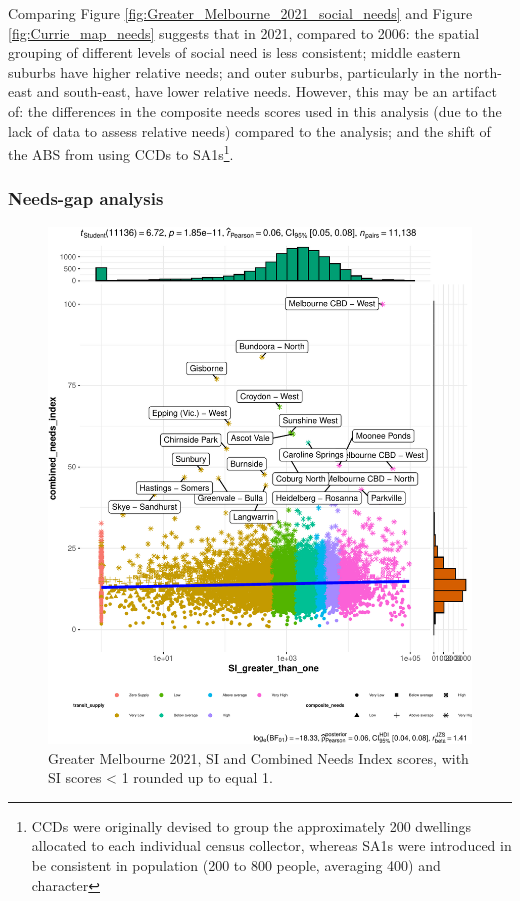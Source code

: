 \documentclass[preprint, 3p,
authoryear]{elsarticle} %
\begin{document}
Comparing Figure \ref{fig:Greater_Melbourne_2021_social_needs} and
Figure \ref{fig:Currie_map_needs} suggests that in 2021, compared to
2006: the spatial grouping of different levels of social need is less
consistent; middle eastern suburbs have higher relative needs; and outer
suburbs, particularly in the north-east and south-east, have lower
relative needs. However, this may be an artifact of: the differences in
the composite needs scores used in this analysis (due to the lack of
data to assess relative needs) compared to the
\citet{currie2010identifying} analysis; and the shift of the ABS from
using CCDs to SA1s\footnote{CCDs were originally devised to group the
  approximately 200 dwellings allocated to each individual census
  collector, whereas SA1s were introduced in be consistent in population
  (200 to 800 people, averaging 400) and character\citep{ABS_SA1s_CCDs}}.

\subsubsection{Needs-gap analysis}\label{needs-gap-analysis}

\begin{figure}
\centering
\includegraphics{Leveraging_GTFS_to_assess_transit_supply_Transport_Geography_files/figure-latex/Greater_Melbourne_2021_needs_gap-1.pdf}
\caption{Greater Melbourne 2021, SI and Combined Needs Index scores,
with SI scores \textless{} 1 rounded up to equal 1.}
\end{figure}
\end{document}
